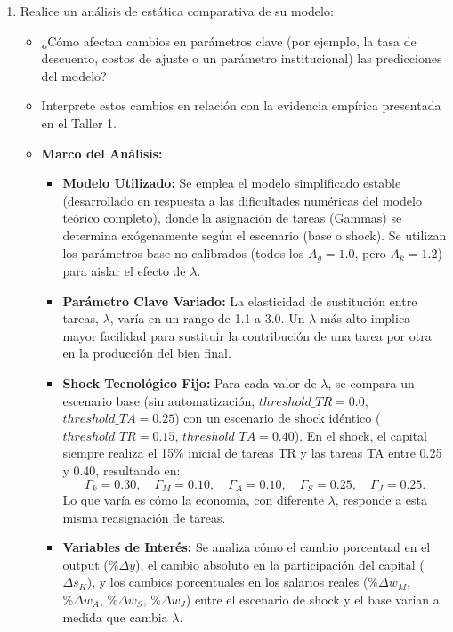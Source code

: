 \documentclass{article}
\theoremstyle{remark}
\theoremstyle{definition}
\begin{document}
\begin{enumerate}\addtocounter{enumi}{4}
    \item Realice un análisis de estática comparativa de su modelo:
    \begin{itemize}
        \item ¿Cómo afectan cambios en parámetros clave (por ejemplo, la tasa de descuento, costos de ajuste o un parámetro institucional) las predicciones del modelo?
        \item Interprete estos cambios en relación con la evidencia empírica presentada en el Taller 1.
    \end{itemize}

        \begin{tcolorbox}[title= Soluci\'on 5]
            \begin{itemize}
              \item \textbf{Marco del Análisis:}
                \begin{itemize}
                  \item \textbf{Modelo Utilizado:} Se emplea el modelo simplificado estable (desarrollado en respuesta a las dificultades numéricas del modelo teórico completo), donde la asignación de tareas (Gammas) se determina exógenamente según el escenario (base o shock). Se utilizan los parámetros base no calibrados (todos los \(A_g=1.0\), pero \(A_k=1.2\)) para aislar el efecto de \(\lambda\).
                  \item \textbf{Parámetro Clave Variado:} La elasticidad de sustitución entre tareas, \(\lambda\), varía en un rango de 1.1 a 3.0. Un \(\lambda\) más alto implica mayor facilidad para sustituir la contribución de una tarea por otra en la producción del bien final.
                  \item \textbf{Shock Tecnológico Fijo:} Para cada valor de \(\lambda\), se compara un escenario base (sin automatización, \(threshold\_TR=0.0\), \(threshold\_TA=0.25\)) con un escenario de shock idéntico (\(threshold\_TR=0.15\), \(threshold\_TA=0.40\)). En el shock, el capital siempre realiza el 15\% inicial de tareas TR y las tareas TA entre 0.25 y 0.40, resultando en:
                    \[
                    \Gamma_k=0.30,\quad \Gamma_M=0.10,\quad \Gamma_A=0.10,\quad \Gamma_S=0.25,\quad \Gamma_J=0.25.
                    \]
                    Lo que varía es cómo la economía, con diferente \(\lambda\), responde a esta misma reasignación de tareas.
                  \item \textbf{Variables de Interés:} Se analiza cómo el cambio porcentual en el output (\(\%\Delta y\)), el cambio absoluto en la participación del capital (\(\Delta s_K\)), y los cambios porcentuales en los salarios reales (\(\%\Delta w_M\), \(\%\Delta w_A\), \(\%\Delta w_S\), \(\%\Delta w_J\)) entre el escenario de shock y el base varían a medida que cambia \(\lambda\).
                \end{itemize}
    

\end{itemize}
\end{tcolorbox}
\end{enumerate}
\end{document}
